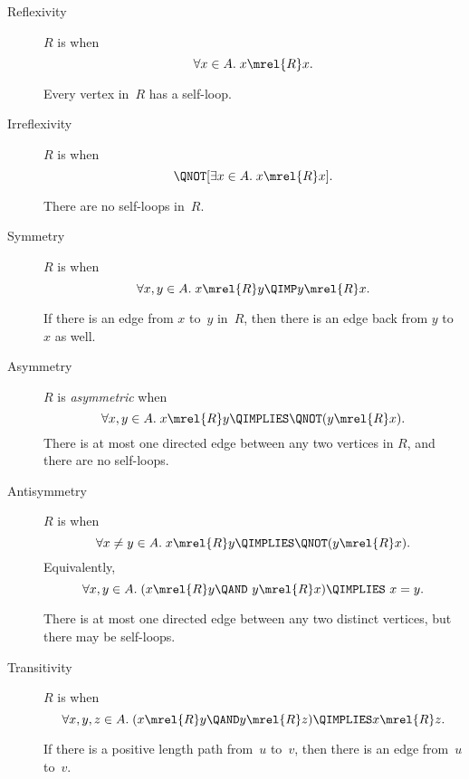 \begin{description}

\item[Reflexivity]

$R$ is  when
\[
\forall x \in A. \; x \mrel{R} x.
\]


Every vertex in~$R$ has a self-loop.

\item[Irreflexivity]

$R$ is  when
\[
\QNOT[ \exists x \in A. \; x \mrel{R} x].
\]


There are no self-loops in~$R$.

\item[Symmetry]

$R$ is  when
\[
\forall x, y \in A. \; x \mrel{R} y \QIMP y \mrel{R} x.
\]


If there is an edge from $x$ to~$y$ in~$R$, then there is an edge back
from $y$ to~$x$ as well.

\item[Asymmetry]
$R$ is \emph{asymmetric} when
\[
\forall x, y \in A. \; x \mrel{R} y \QIMPLIES \QNOT( y \mrel{R} x ).
\]
There is at most one directed edge between any two vertices in $R$,
and there are no self-loops.

\item[Antisymmetry]
$R$ is  when
\[
\forall x \neq y \in A. \; x \mrel{R} y \QIMPLIES \QNOT( y \mrel{R} x ).
\]
Equivalently,
\[
\forall x, y \in A. \; (x \mrel{R} y \QAND\ y \mrel{R} x ) \QIMPLIES\ x = y.
\]

There is at most one directed edge between any two distinct vertices,
but there may be self-loops.

\item[Transitivity]
$R$ is  when
\[
 \forall x, y, z \in A. \; (x \mrel{R} y \QAND y \mrel{R} z) \QIMPLIES x \mrel{R} z.
\]

If there is a positive length path from~$u$ to~$v$, then there is an edge from~$u$ to~$v$.

\iffalse
For any walk $v_0, v_1, \dots, v_k$ in~$G$ where $k \ge 2$,
$\diredge{v_0}{v_k}$ is in~$G$ (and, hence, $\diredge{v_i}{v_j}$ is
also in~$G$ for all $i < j$.
\fi


\end{description}

